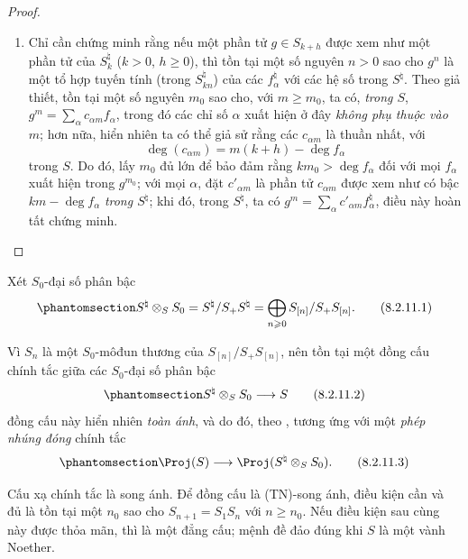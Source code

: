 \documentclass[oneside,10pt]{amsart}
\makeatletter
\renewcommand{\geq}{\geqslant}
\newcommand{\ega@arrow}[2]{\mathchoice{#1}{#2}{#2}{#2}}
\renewcommand{\to}{\ega@arrow{\longrightarrow}{\rightarrow}}
\newcommand{\oldpage}[2][]{\marginnote{\normalfont\footnotesize\textbf{#1}~|~#2}\ignorespaces}
\let\EGAOriginalLabel\label
\renewcommand{\label}[1]{\phantomsection\EGAOriginalLabel{#1}}
\makeatother
\begin{document}
\begin{proof}
\begin{enumerate}
    do đó, đẳng thức $S_n^\natural=S_1^{\natural n}$ kéo theo $S_n=S_1^n$.
  \item[\rm{(iv)}] Chỉ cần chứng minh rằng nếu một phần tử $g\in S_{k+h}$ được xem như một phần tử của $S_k^\natural$ ($k>0$, $h\geq0$), thì tồn tại một số nguyên $n>0$ sao cho $g^n$ là một tổ hợp tuyến tính (trong $S_{kn}^\natural$) của các $f_\alpha^\natural$ với các hệ số trong $S^\natural$.
    Theo giả thiết, tồn tại một số nguyên $m_0$ sao cho, với $m\geq m_0$, ta có, \emph{trong $S$}, $g^m = \sum_\alpha c_{\alpha m}f_\alpha$, trong đó các chỉ số $\alpha$ xuất hiện ở đây \emph{không phụ thuộc vào $m$};
    hơn nữa, hiển nhiên ta có thể giả sử rằng các $c_{\alpha m}$ là thuần nhất, với
    \[
      \deg(c_{\alpha m}) = m(k+h)-\deg f_\alpha
    \]
    trong $S$.
    Do đó, lấy $m_0$ đủ lớn để bảo đảm rằng $km_0>\deg f_\alpha$ đối với mọi $f_\alpha$ xuất hiện trong $g^{m_0}$;
    với mọi $\alpha$, đặt $c'_{\alpha m}$ là phần tử $c_{\alpha m}$ được xem như có bậc $km-\deg f_\alpha$ \emph{trong $S^\natural$};
    khi đó, trong $S^\natural$, ta có $g^m = \sum_\alpha c'_{\alpha m}f_\alpha^\natural$, điều này hoàn tất chứng minh.
\end{enumerate}
\end{proof}

\begin{env}[8.2.11]
\label{II.8.2.11}
Xét $S_0$-đại số phân bậc
\[
\label{II.8.2.11.1}
  S^\natural \otimes_S S_0
  =
  S^\natural/S_+S^\natural
  =
  \bigoplus_{n\geq0} S_{[n]}/S_+S_{[n]}.
\tag{8.2.11.1}
\]

Vì $S_n$ là một $S_0$-môđun thương của $S_{[n]}/S_+S_{[n]}$, nên tồn tại một đồng cấu chính tắc giữa các $S_0$-đại số phân bậc
\[
\label{II.8.2.11.2}
  S^\natural \otimes_S S_0 \to S
\tag{8.2.11.2}
\]
đồng cấu này hiển nhiên \emph{toàn ánh}, và do đó, theo , tương ứng với một \emph{phép nhúng đóng} chính tắc
\[
\label{II.8.2.11.3}
  \Proj(S) \to \Proj(S^\natural \otimes_S S_0).
\tag{8.2.11.3}
\]
\end{env}

\oldpage[II]{161}
\begin{proposition}[8.2.12]
\label{II.8.2.12}
Cấu xạ chính tắc  là song ánh.
Để đồng cấu  là (TN)-song ánh, điều kiện cần và đủ là tồn tại một $n_0$ sao cho $S_{n+1}=S_1S_n$ với $n\geq n_0$.
Nếu điều kiện sau cùng này được thỏa mãn, thì  là một đẳng cấu;
mệnh đề đảo đúng khi $S$ là một vành Noether.
\end{proposition}
\end{document}
